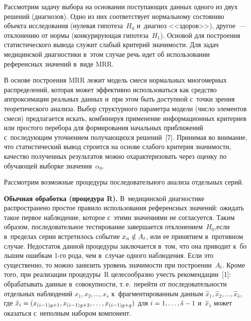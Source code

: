 \begin{multicols}{2}
     Рассмотрим задачу выбора на основании поступающих данных одного из 
двух решений (диагнозов). Одно из них соответствует нормальному состоянию 
объекта исследования (нулевая гипотеза~$H_0$ и~диагноз <<здоров>>), 
другое~--- отклонению от нормы (конкурирующая гипотеза~$H_1$). Основой 
для построения статистического вывода служит слабый критерий значимости. 
Для задач медицинской диагностики в~этом случае речь идет об использовании 
референсных значений в~виде MRR.
     
     В основе построения MRR лежит модель смеси нормальных 
многомерных распределений, которая может эффективно использоваться как 
средство аппроксимации реальных данных и~при этом быть доступной с~точки 
зрения теоретического анализа. Выбор структурного параметра модели (число 
элементов смеси) предлагается искать, комбинируя применение 
информационных критериев или простого перебора для формирования 
начальных приближений с~последующим уточнением получающихся 
решений~[7]. Принимая во внимание, что статистический вывод строится на 
основе слабого критерия значимости, качество полученных результатов можно 
охарактеризовать через оценку по обучающей выборке значения~$\alpha_0$.
      
     Рассмотрим возможные процедуры последовательного анализа 
отдельных серий.
     
     \textbf{Обычная обработка (процедура R).} В~медицинской 
диагностике распространено простое правило\linebreak
 использования референсных 
значений: ожидать такое первое наблюдение, которое с~этими значениями не 
согласуется. Таким образом, последовательное тестирование завершается 
отклонением~$H_0$,\linebreak если в~пределах серии встретилось событие 
$x_n\hm\notin A_t$, или ее принятием в~противном случае. Недостаток данной 
процедуры заключается в~том, что она приводит к~б$\acute{\mbox{о}}$льшим 
ошибкам 1-го рода, чем в~случае одного наблюдения. Если это существенно, то 
можно занизить уровень значимости при по\-стро\-ении~$A_t$. Кроме того, при 
реализации процедуры~R целесообразно учесть рекомендации~[1]: 
обрабатывать данные в~совокупности, т.\,е.\ перейти от последовательности 
отдельных наблюдений $x_1, x_2, \ldots , x_s$ к~фрагментированным данным 
$\hat{x}_1, \hat{x}_2, \ldots , \hat{x}_{\hat{s}}$, где 
$\hat{x}_i\hm= ( x_{(i-
1)g+1}, x_{(i-1)g+2}, \ldots , x_{(i-1)g+g})$ для $i\hm= 1, \ldots , \hat{s}-1$ 
и~$\hat{x}_{\hat{s}}$ может оказаться с~неполным набором компонент.
     

\end{multicols}
